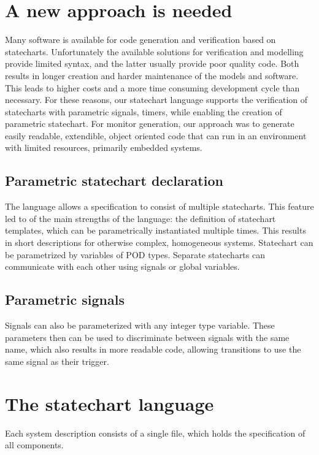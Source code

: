 \section{A new approach is needed}
Many software is available for code generation and verification based on statecharts. Unfortunately the available solutions for verification and modelling provide limited syntax, and the latter usually provide poor quality code. Both results in longer creation and harder maintenance of the models and software. This leads to higher costs and a more time consuming development cycle than necessary. For these reasons, our statechart language supports the verification of statecharts with parametric signals, timers, while enabling the creation of parametric statechart. For monitor generation, our approach was to generate easily readable, extendible, object oriented code that can run in an environment with limited resources, primarily embedded systems.
  \subsection{Parametric statechart declaration}
The language allows a specification to consist of multiple statecharts. This feature led to of the main strengths of the language: the definition of statechart templates, which can be parametrically instantiated multiple times. This results in short descriptions for otherwise complex, homogeneous systems. Statechart can be parametrized by variables of POD types. Separate statecharts can communicate with each other using signals or global variables.
  \subsection{Parametric signals}
Signals can also be parameterized with any integer type variable. These parameters then can be used to discriminate between signals with the same name, which also results in more readable code, allowing transitions to use the same signal as their trigger.
\section{The statechart language}
Each system description consists of a single file, which holds the specification of all components.

